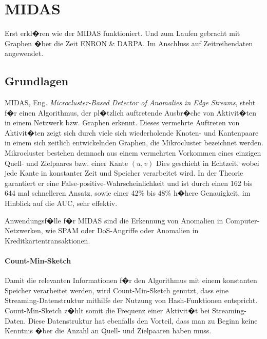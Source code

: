 \newpage
\chapter{MIDAS}
\label{chap:mc}

Erst erkl�ren wie der MIDAS funktioniert. Und zum Laufen gebracht mit Graphen �ber die Zeit ENRON \& DARPA. Im Anschluss auf Zeitreihendaten angewendet.


\section{Grundlagen}
\label{sec:mc-gl}

MIDAS, Eng. \textit{Microcluster-Based Detector of Anomalies in Edge Streams}, steht f�r einen Algorithmus, der pl�tzlich auftretende Ausbr�che von Aktivit�ten in einem Netzwerk bzw. Graphen erkennt. Dieses vermehrte Auftreten von Aktivit�ten zeigt sich durch viele sich wiederholende Knoten- und Kantenpaare in einem sich zeitlich entwickelnden Graphen, die Mikrocluster bezeichnet werden. Mikrocluster bestehen demnach aus einem vermehrten Vorkommen eines einzigen Quell- und Zielpaares bzw. einer Kante $(u,v)$   Dies geschieht in Echtzeit, wobei jede Kante in konstanter Zeit und Speicher verarbeitet wird. In der Theorie garantiert er eine False-positive-Wahrscheinlichkeit und ist durch einen 162 bis 644 mal schnelleren Ansatz, sowie einer 42\% bis 48\% h�here Genauigkeit, im Hinblick auf die AUC, sehr effektiv. \citep[vgl.][S.~1]{MIDAS}

Anwendungsf�lle f�r MIDAS sind die Erkennung von Anomalien in Computer-Netzwerken, wie SPAM oder DoS-Angriffe oder Anomalien in Kreditkartentransaktionen.


\subsubsection{Count-Min-Sketch}
\label{sec:mc-gl-cms}
Damit die relevanten Informationen f�r den Algorithmus mit einem konstanten Speicher verarbeitet werden, wird Count-Min-Sketch genutzt, dass eine Streaming-Datenstruktur mithilfe der Nutzung von Hash-Funktionen entspricht. Count-Min-Sketch z�hlt somit die Frequenz einer Aktivit�t bei Streaming-Daten. Diese Datenstruktur hat ebenfalls den Vorteil, dass man zu Beginn keine Kenntnis �ber die Anzahl an Quell- und Zielpaaren haben muss.

